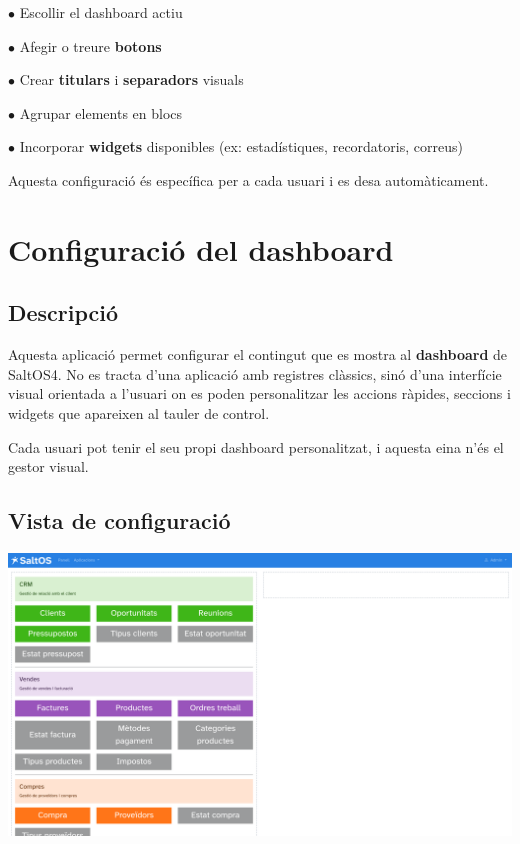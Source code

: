 \documentclass[a4paper]{article}
\begin{document}
\begin{compactitem}
\item[\color{myblue}$\bullet$] Escollir el dashboard actiu
\item[\color{myblue}$\bullet$] Afegir o treure \textbf{botons}
\item[\color{myblue}$\bullet$] Crear \textbf{titulars} i \textbf{separadors} visuals
\item[\color{myblue}$\bullet$] Agrupar elements en blocs
\item[\color{myblue}$\bullet$] Incorporar \textbf{widgets} disponibles (ex: estadístiques, recordatoris, correus)
\end{compactitem}

Aquesta configuració és específica per a cada usuari i es desa automàticament.


\hypertarget{toc85}{}
\section{Configuració del dashboard}

\hypertarget{toc86}{}
\subsection{Descripció}

Aquesta aplicació permet configurar el contingut que es mostra al \textbf{dashboard} de SaltOS4.
No es tracta d’una aplicació amb registres clàssics, sinó d’una interfície visual orientada a l’usuari on es poden personalitzar les accions ràpides, seccions i widgets que apareixen al tauler de control.

Cada usuari pot tenir el seu propi dashboard personalitzat, i aquesta eina n'és el gestor visual.

\hypertarget{toc87}{}
\subsection{Vista de configuració}

\begin{center}\includegraphics[width=1\textwidth]{../ujest/snaps/test-screenshots-js-screenshots-dashboard-dashboard-widgets-ca-es-1-snap.png}\end{center}
\end{document}
